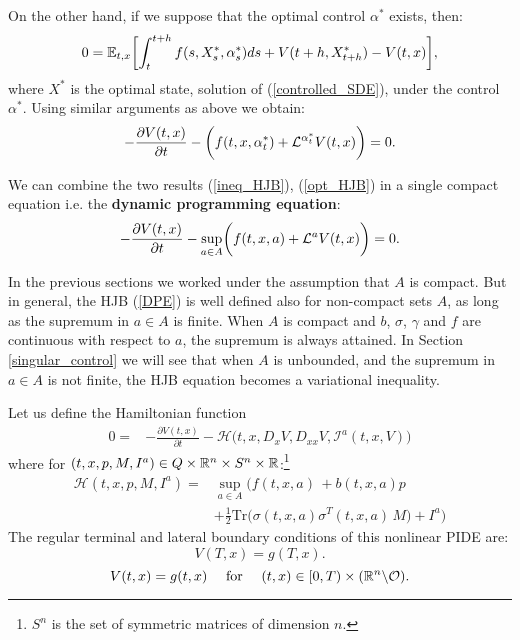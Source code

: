 On the other hand, if we suppose that the optimal control $\alpha^*$ exists, then:
\begin{equation}
 0 = \mathbb{E}_{t,x} \biggl[ \int_t^{t+h} f(s,X^*_s,\alpha^*_s) ds + V(t+h, X^*_{t+h}) - V(t,x) \biggr],
\end{equation}
where $X^*$ is the optimal state, solution of (\ref{controlled_SDE}), under the control $\alpha^*$.
Using similar arguments as above we obtain:
\begin{equation}\label{opt_HJB}
 -\frac{\partial V(t,x)}{\partial t} - \biggl( f(t,x,\alpha_t^*) + \mathcal{L}^{\alpha_t^*} V(t,x)  \biggr) = 0.
\end{equation}

We can combine the two results (\ref{ineq_HJB}), (\ref{opt_HJB}) in a single compact equation i.e. the \textbf{dynamic programming equation}:
\begin{equation}\label{DPE}
 -\frac{\partial V(t,x)}{\partial t} - \sup_{a \in A} \biggl( f(t,x,a) + \mathcal{L}^{a}V(t,x)  \biggr) = 0.
\end{equation}

\begin{Remark}
In the previous sections we worked under the assumption that $A$ is compact. 
But in general, the HJB (\ref{DPE}) is well defined also for non-compact sets $A$, as long as the supremum in $a\in A$ is finite.
When $A$ is compact and $b$, $\sigma$, $\gamma$ and $f$ are continuous with respect to $a$, the supremum is always attained. 
In Section \ref{singular_control} we will see that when $A$ is unbounded, and the supremum in $a\in A$ is not finite, the HJB equation becomes a variational inequality.
\end{Remark}

Let us define the Hamiltonian function
\begin{align} \nonumber
 0 = & - \frac{\partial V(t,x)}{\partial t} - \mathcal{H}\bigl( t,x,D_x V, D_{xx} V, \mathcal{I}^a(t,x,V) \bigr) 
\end{align}
where for $(t,x,p,M,I^a) \in Q \times \mathbb{R}^n \times S^n \times \mathbb{R}$:\footnote{$S^n$ is the set of symmetric matrices of dimension $n$.} 
\begin{align}\label{Hamiltonian}
 \mathcal{H}(t,x,p,M,I^a) =& \sup_{a \in A} \biggl( f(t,x,a) \, + b(t,x,a) p \\ \nonumber
              &+ \frac{1}{2} \mbox{Tr} \bigl( \sigma(t,x,a)\sigma^T(t,x,a) \, M \bigr) +I^a \biggr) 
\end{align}
The regular terminal and lateral boundary conditions of this nonlinear PIDE are: 
\begin{equation}\label{DPE_term_cond}
 V(T,x) = g(T,x).
\end{equation}
\begin{equation}\label{DPE_lateral_cond}
 V(t,x) = g(t,x) \quad \mbox{ for } \quad (t,x) \in [0,T)\times (\mathbb{R}^n \backslash \mathcal{O}). 
\end{equation}


